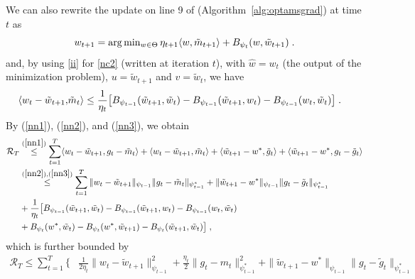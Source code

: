 \documentclass[twoside]{article}
\makeatletter
\renewenvironment{proof}[1][\proofname]{%
   \par\pushQED{\qed}\normalfont%
   \topsep6\p@\@plus6\p@\relax
   \trivlist\item[\hskip\labelsep\bfseries#1]%
   \ignorespaces
}{%
   \popQED\endtrivlist\@endpefalse
}
\makeatother
\begin{document}
\begin{proof}
We can also rewrite the update on line 9 of (Algorithm~\ref{alg:optamsgrad}) at time $t$ as
\begin{equation} \label{nc2}
\textstyle w_{t+1} = \arg\min_{w \in \Theta} \eta_{t+1} \langle w, \tilde{m}_{t+1} \rangle + B_{\psi_t}(w, \tilde{w}_{t+1} ) \;.
\end{equation}
and, by using \eqref{ii} for \eqref{nc2} (written at iteration $t$), with $\hat{w} = w_{t}$ (the output of the minimization problem), $u = \tilde{w}_{t+1}$ and $v = \tilde{w}_{t}$, we have
\begin{equation} \label{nn3}
\begin{aligned}
\langle w_t -\tilde{w}_{t+1}, & \tilde{m}_t  \rangle \leq \frac{1}{\eta_t}\big[ B_{\psi_{t-1}}(\tilde{w}_{t+1}, \tilde{w}_{t}) - B_{\psi_{t-1}}(\tilde{w}_{t+1}, w_t ) - B_{\psi_{t-1}}(w_{t}, \tilde{w}_{t}) \big] \;.
\end{aligned}
\end{equation}
By (\ref{nn1}), (\ref{nn2}), and (\ref{nn3}), we obtain
\begin{equation} \label{nnn}
\begin{aligned}
 \mathcal{R}_T & \overset{(\ref{nn1})}{\leq} \sum_{t=1}^T \langle  w_t - \tilde{w}_{t+1} , g_t - \tilde{m}_t \rangle + \langle w_t - \tilde{w}_{t+1}, \tilde{m}_t \rangle + \langle \tilde{w}_{t+1} - w^*, \tilde{g}_t  \rangle+ \langle \tilde{w}_{t+1} - w^*,g_t - \tilde{g}_t  \rangle \\
& \overset{(\ref{nn2}), (\ref{nn3})}{\leq}  \sum_{t=1}^T \| w_t - \tilde{w}_{t+1} \|_{\psi_{t-1}} \| g_t - \tilde{m}_t  \|_{\psi_{t-1}^*} + \|  \tilde{w}_{t+1} - w^* \|_{\psi_{t-1}} \| g_t - \tilde{g}_t  \|_{\psi_{t-1}^*}\\
&+ \frac{1}{\eta_t} \big[ B_{\psi_{t-1}}(\tilde{w}_{t+1}, \tilde{w}_{t}) - B_{\psi_{t-1}}(\tilde{w}_{t+1}, w_t ) - B_{\psi_{t-1}}(w_{t}, \tilde{w}_{t}) \\
& +  B_{\psi_t}( w^*, \tilde{w}_{t}) -B_{\psi_t}(w^*,  \tilde{w}_{t+1} ) - B_{\psi_t}(\tilde{w}_{t+1}, \tilde{w}_{t}) \big] \;,
\end{aligned}
\end{equation}
which is further bounded by
\begin{equation} \label{nnnn}
\begin{aligned}
  \mathcal{R}_T \leq \sum_{t=1}^T \Big\{  & \frac{1}{2 \eta_t} \| w_t - \tilde{w}_{t+1} \|_{\psi_{t-1}}^2 + \frac{\eta_t}{2} \| g_t - m_t  \|_{\psi_{t-1}^*}^2+ \|  \tilde{w}_{t+1} - w^* \|_{\psi_{t-1}} \| g_t - \tilde{g}_t  \|_{\psi_{t-1}^*}\\\

\end{aligned}
\end{equation}
\end{proof}
\end{document}
